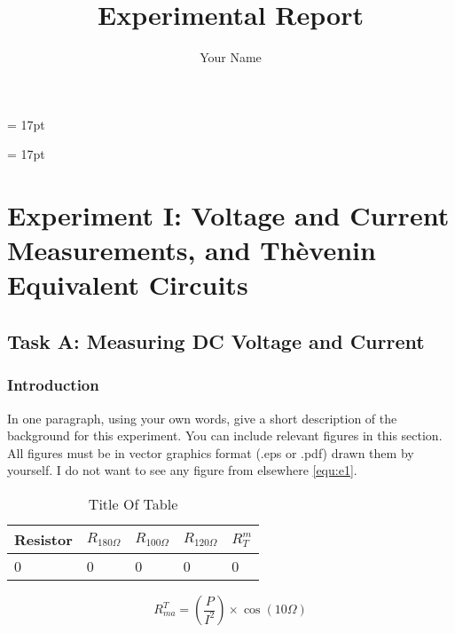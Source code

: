 \documentclass[11pt]{article}
\title{Experimental Report}
\author{Your Name}
\begin{document}
\maketitle
\baselineskip = 17pt

\tableofcontents
\newpage
\baselineskip = 17pt

\section{Experiment I: Voltage and Current Measurements, and Th\`{e}venin Equivalent Circuits}

\subsection{Task A: Measuring DC Voltage and Current}
   \subsubsection{Introduction}
In one paragraph, using your own words, give a short description of the background for this experiment.  You can include relevant figures in this section.  All figures must be in vector graphics format (.eps or .pdf) drawn them by yourself.  I do not want to see any figure from elsewhere \ref{equ:e1}. 

\begin{table}[h]
\centering
\label{tab:table123}
\caption{Title Of Table}
\begin{tabular}{|p{3cm}|p{1.5cm}|p{1.5cm}|p{1.5cm}|p{1.5cm}|}
\hline
Resistor & $R_{180\Omega}$ & $R_{100\Omega}$ & $R_{120\Omega}$ & $R_T^m$\\
\hline
0 & 0 & 0 & 0 & 0 \\
\hline
\end{tabular}
\end{table}

\begin{equation}\label{equ:e1}
R_{ma}^T=\left(\frac{P}{I^2}\right) \times \cos(10\Omega) 
\end{equation}


\end{document}
